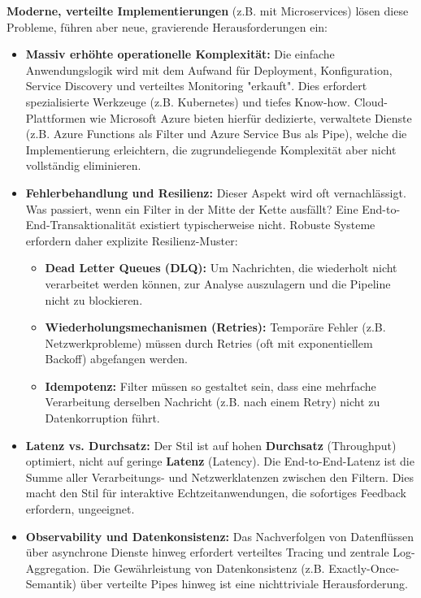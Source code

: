 \documentclass[10pt,a4paper]{article}
\begin{document}
\textbf{Moderne, verteilte Implementierungen} (z.B. mit Microservices) lösen diese Probleme, führen aber neue, gravierende Herausforderungen ein:
\begin{itemize}
\item \textbf{Massiv erhöhte operationelle Komplexität:} Die einfache Anwendungslogik wird mit dem Aufwand für Deployment, Konfiguration, Service Discovery und verteiltes Monitoring "erkauft". Dies erfordert spezialisierte Werkzeuge (z.B. Kubernetes) und tiefes Know-how.\cite{richards2020}
Cloud-Plattformen wie Microsoft Azure bieten hierfür dedizierte, verwaltete Dienste (z.B. Azure Functions als Filter und Azure Service Bus als Pipe), welche die Implementierung erleichtern, die zugrundeliegende Komplexität aber nicht vollständig eliminieren.\cite{azure_pipes_filters}

\item \textbf{Fehlerbehandlung und Resilienz:} Dieser Aspekt wird oft vernachlässigt. Was passiert, wenn ein Filter in der Mitte der Kette ausfällt? Eine End-to-End-Transaktionalität existiert typischerweise nicht. Robuste Systeme erfordern daher explizite Resilienz-Muster:
    \begin{itemize}
        \item \textbf{Dead Letter Queues (DLQ):} Um Nachrichten, die wiederholt nicht verarbeitet werden können, zur Analyse auszulagern und die Pipeline nicht zu blockieren.
        \item \textbf{Wiederholungsmechanismen (Retries):} Temporäre Fehler (z.B. Netzwerkprobleme) müssen durch Retries (oft mit exponentiellem Backoff) abgefangen werden.
        \item \textbf{Idempotenz:} Filter müssen so gestaltet sein, dass eine mehrfache Verarbeitung derselben Nachricht (z.B. nach einem Retry) nicht zu Datenkorruption führt.
    \end{itemize}
\item \textbf{Latenz vs. Durchsatz:} Der Stil ist auf hohen \textbf{Durchsatz} (Throughput) optimiert, nicht auf geringe \textbf{Latenz} (Latency). Die End-to-End-Latenz ist die Summe aller Verarbeitungs- und Netzwerklatenzen zwischen den Filtern. Dies macht den Stil für interaktive Echtzeitanwendungen, die sofortiges Feedback erfordern, ungeeignet.\cite{uqcloud_pipeline}
\item \textbf{Observability und Datenkonsistenz:} Das Nachverfolgen von Datenflüssen über asynchrone Dienste hinweg erfordert verteiltes Tracing und zentrale Log-Aggregation. Die Gewährleistung von Datenkonsistenz (z.B. Exactly-Once-Semantik) über verteilte Pipes hinweg ist eine nichttriviale Herausforderung.\cite{richards2020}
\end{itemize}
\end{document}
